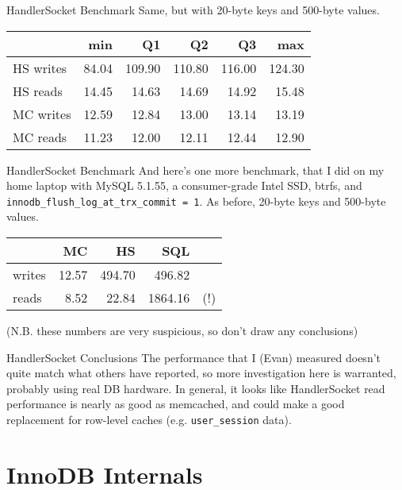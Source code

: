 \documentclass[14pt]{beamer}
\begin{document}
\begin{frame}{HandlerSocket Benchmark}
  Same, but with 20-byte keys and 500-byte values.
  \begin{tabular}{l r r r r r}
                      & min   & Q1     & Q2     & Q3     & max    \\ \hline
    HS writes         & 84.04 & 109.90 & 110.80 & 116.00 & 124.30 \\
    HS reads          & 14.45 & 14.63  & 14.69  & 14.92  & 15.48  \\
    MC writes         & 12.59 & 12.84  & 13.00  & 13.14  & 13.19  \\
    MC reads          & 11.23 & 12.00  & 12.11  & 12.44  & 12.90  \\
  \end{tabular}
\end{frame}

\begin{frame}{HandlerSocket Benchmark}
  And here's one more benchmark, that I did on my home laptop with MySQL 5.1.55,
  a consumer-grade Intel SSD, btrfs, and
  \texttt{innodb\_flush\_log\_at\_trx\_commit = 1}. As before, 20-byte keys and
  500-byte values.

  \begin{table}[ht]
  \begin{tabular}{l r r r l}
           & MC    & HS     & SQL     & \\ \hline
    writes & 12.57 & 494.70 & 496.82  & \\
    reads  & 8.52  & 22.84  & 1864.16 & (!)\\
  \end{tabular}
  \end{table}
  (N.B. these numbers are very suspicious, so don't draw any conclusions)
\end{frame}

\begin{frame}{HandlerSocket Conclusions}
  The performance that I (Evan) measured doesn't quite match what others have
  reported, so more investigation here is warranted, probably using real DB
  hardware.
  \newline
  \newline
  In general, it looks like HandlerSocket read performance is nearly as good as
  memcached, and could make a good replacement for row-level caches (e.g. \texttt{user\_session} data).
\end{frame}

\section{InnoDB Internals}
\end{document}
